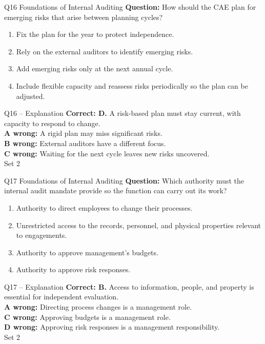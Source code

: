 \documentclass[aspectratio=169,10pt]{beamer}
\begin{document}
\begin{frame}[t]{Q16 \hfill {\scriptsize Foundations of Internal Auditing}}
	\small
	\textbf{Question:} How should the CAE plan for emerging risks that arise between planning cycles?
	\begin{enumerate}[label=\Alph*.,itemsep=1pt,topsep=3pt]
			\item Fix the plan for the year to protect independence.
			\item Rely on the external auditors to identify emerging risks.
			\item Add emerging risks only at the next annual cycle.
			\item Include flexible capacity and reassess risks periodically so the plan can be adjusted.
	\end{enumerate}
\end{frame}

\begin{frame}[t]{Q16 -- Explanation}
	\footnotesize
	\textbf{Correct: D.} A risk-based plan must stay current, with capacity to respond to change. \\[5pt]
\textbf{A wrong:} A rigid plan may miss significant risks. \\[3pt]
\textbf{B wrong:} External auditors have a different focus. \\[3pt]
\textbf{C wrong:} Waiting for the next cycle leaves new risks uncovered. \\[3pt]
	\vfill {\tiny Set 2}
\end{frame}

\begin{frame}[t]{Q17 \hfill {\scriptsize Foundations of Internal Auditing}}
	\small
	\textbf{Question:} Which authority must the internal audit mandate provide so the function can carry out its work?
	\begin{enumerate}[label=\Alph*.,itemsep=1pt,topsep=3pt]
			\item Authority to direct employees to change their processes.
			\item Unrestricted access to the records, personnel, and physical properties relevant to engagements.
			\item Authority to approve management's budgets.
			\item Authority to approve risk responses.
	\end{enumerate}
\end{frame}

\begin{frame}[t]{Q17 -- Explanation}
	\footnotesize
	\textbf{Correct: B.} Access to information, people, and property is essential for independent evaluation. \\[5pt]
\textbf{A wrong:} Directing process changes is a management role. \\[3pt]
\textbf{C wrong:} Approving budgets is a management role. \\[3pt]
\textbf{D wrong:} Approving risk responses is a management responsibility. \\[3pt]
	\vfill {\tiny Set 2}
\end{frame}
\end{document}
